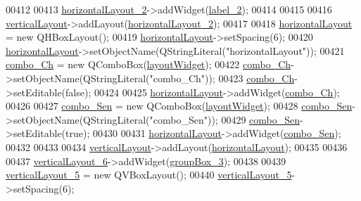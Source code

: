 \begin{DoxyCode}
00412 
00413         \hyperlink{a00027_a80867018070156432923d0266cc9fe25}{horizontalLayout\_2}->addWidget(\hyperlink{a00027_a2e2516d755e4dd53fc905dabddf2738a}{label\_2});
00414 
00415 
00416         \hyperlink{a00027_aecd96a04789fcfec3f98d80390ad8184}{verticalLayout}->addLayout(\hyperlink{a00027_a80867018070156432923d0266cc9fe25}{horizontalLayout\_2});
00417 
00418         \hyperlink{a00027_acd6fdc9ebacc4b25b834162380d75ce8}{horizontalLayout} = \textcolor{keyword}{new} QHBoxLayout();
00419         \hyperlink{a00027_acd6fdc9ebacc4b25b834162380d75ce8}{horizontalLayout}->setSpacing(6);
00420         \hyperlink{a00027_acd6fdc9ebacc4b25b834162380d75ce8}{horizontalLayout}->setObjectName(QStringLiteral(\textcolor{stringliteral}{"horizontalLayout"}));
00421         \hyperlink{a00027_a263fb43f2eff37a44ff7359ba41e2eeb}{combo\_Ch} = \textcolor{keyword}{new} QComboBox(\hyperlink{a00027_ab96ab0f0578098521fa69a75aa5cdde8}{layoutWidget});
00422         \hyperlink{a00027_a263fb43f2eff37a44ff7359ba41e2eeb}{combo\_Ch}->setObjectName(QStringLiteral(\textcolor{stringliteral}{"combo\_Ch"}));
00423         \hyperlink{a00027_a263fb43f2eff37a44ff7359ba41e2eeb}{combo\_Ch}->setEditable(\textcolor{keyword}{false});
00424 
00425         \hyperlink{a00027_acd6fdc9ebacc4b25b834162380d75ce8}{horizontalLayout}->addWidget(\hyperlink{a00027_a263fb43f2eff37a44ff7359ba41e2eeb}{combo\_Ch});
00426 
00427         \hyperlink{a00027_ad95005b5fcac8126171019298147b285}{combo\_Sen} = \textcolor{keyword}{new} QComboBox(\hyperlink{a00027_ab96ab0f0578098521fa69a75aa5cdde8}{layoutWidget});
00428         \hyperlink{a00027_ad95005b5fcac8126171019298147b285}{combo\_Sen}->setObjectName(QStringLiteral(\textcolor{stringliteral}{"combo\_Sen"}));
00429         \hyperlink{a00027_ad95005b5fcac8126171019298147b285}{combo\_Sen}->setEditable(\textcolor{keyword}{true});
00430 
00431         \hyperlink{a00027_acd6fdc9ebacc4b25b834162380d75ce8}{horizontalLayout}->addWidget(\hyperlink{a00027_ad95005b5fcac8126171019298147b285}{combo\_Sen});
00432 
00433 
00434         \hyperlink{a00027_aecd96a04789fcfec3f98d80390ad8184}{verticalLayout}->addLayout(\hyperlink{a00027_acd6fdc9ebacc4b25b834162380d75ce8}{horizontalLayout});
00435 
00436 
00437         \hyperlink{a00027_a93c190b085c63a667c535ba0bbcfec7c}{verticalLayout\_6}->addWidget(\hyperlink{a00027_a320d3d7ba1cb8fff7b7b95923ed10f5e}{groupBox\_3});
00438 
00439         \hyperlink{a00027_afcc20a3d5058037a00cdc6122f231848}{verticalLayout\_5} = \textcolor{keyword}{new} QVBoxLayout();
00440         \hyperlink{a00027_afcc20a3d5058037a00cdc6122f231848}{verticalLayout\_5}->setSpacing(6);

\end{DoxyCode}

